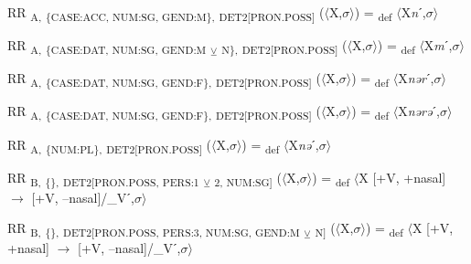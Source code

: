 {\begin{exe}
 RR \textsubscript{A,} \textsubscript{\{CASE:ACC, NUM:SG, GEND:M\},} \textsubscript{DET2[PRON.POSS]} ($\langle$X,$\sigma $$\rangle$) = \textsubscript{def} $\langle$X\textit{n}ˊ,$\sigma $$\rangle$
\end{exe}

\begin{exe}
 RR \textsubscript{A,} \textsubscript{\{CASE:DAT, NUM:SG, GEND:M} \textsubscript{${\veebar}$}\textsubscript{ N\},} \textsubscript{DET2[PRON.POSS]} ($\langle$X,$\sigma $$\rangle$) = \textsubscript{def} $\langle$X\textit{m}ˊ,$\sigma $$\rangle$
\end{exe}

\begin{exe}
 RR \textsubscript{A,} \textsubscript{\{CASE:DAT, NUM:SG, GEND:F\},} \textsubscript{DET2[PRON.POSS]} ($\langle$X,$\sigma $$\rangle$) = \textsubscript{def} $\langle$X\textit{nər}ˊ,$\sigma $$\rangle$
\end{exe}

\begin{exe}
 RR \textsubscript{A,} \textsubscript{\{CASE:DAT, NUM:SG, GEND:F\},} \textsubscript{DET2[PRON.POSS]} ($\langle$X,$\sigma $$\rangle$) = \textsubscript{def} $\langle$X\textit{nərə}ˊ,$\sigma $$\rangle$
\end{exe}

\begin{exe}
 RR \textsubscript{A,} \textsubscript{\{NUM:PL\},} \textsubscript{DET2[PRON.POSS]} ($\langle$X,$\sigma $$\rangle$) = \textsubscript{def} $\langle$X\textit{nə}ˊ,$\sigma $$\rangle$
\end{exe}

\begin{exe}
 RR \textsubscript{B,} \textsubscript{\{\},} \textsubscript{DET2[PRON.POSS, PERS:1} \textsubscript{${\veebar}$}\textsubscript{ 2, NUM:SG]} ($\langle$X,$\sigma $$\rangle$) = \textsubscript{def} $\langle$X [+V, +nasal] $\rightarrow$ [+V, –nasal]/\_Vˊ,$\sigma $$\rangle$
\end{exe}

\begin{exe}
 RR \textsubscript{B,} \textsubscript{\{\},} \textsubscript{DET2[PRON.POSS, PERS:3, NUM:SG, GEND:M} \textsubscript{${\veebar}$}\textsubscript{ N]} ($\langle$X,$\sigma $$\rangle$) = \textsubscript{def} $\langle$X [+V, +nasal] $\rightarrow$ [+V, –nasal]/\_Vˊ,$\sigma $$\rangle$
\end{exe}

}
